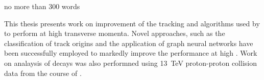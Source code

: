 no more than 300 words

This thesis presents work on improvement of the tracking and \btagging algorithms used by \ATLAS to perform \btagging at high transverse momenta.
Novel approaches, such as the classification of track origins and the application of graph neural networks have been successfully employed to markedly improve the \btagging performance at high \pt.
Work on analaysis of \Hbb decays was also performned using \SI{13}{\TeV} proton-proton collision data from the course of \runtwo.
